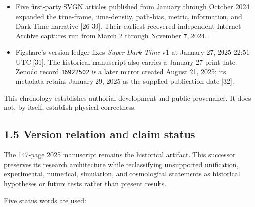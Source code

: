 \documentclass[
  american,
  11pt,
  letterpaper,
]{article}
\begin{document}
\begin{itemize}
  On December 15, 2023, \texttt{QGTCD.md} consolidated the QGTCD program and proposed exploratory mathematical modifications involving a local time-frame variable {[}25{]}. Those equations document development; this successor does not inherit them as validated mathematics.
\item
  Five first-party SVGN articles published from January through October 2024 expanded the time-frame, time-density, path-bias, metric, information, and Dark Time narrative {[}26-30{]}. Their earliest recovered independent Internet Archive captures run from March 2 through November 7, 2024.
\item
  Figshare's version ledger fixes \emph{Super Dark Time} v1 at January 27, 2025 22:51 UTC {[}31{]}. The historical manuscript also carries a January 27 print date. Zenodo record \texttt{16922502} is a later mirror created August 21, 2025; its metadata retains January 29, 2025 as the supplied publication date {[}32{]}.
\end{itemize}

This chronology establishes authorial development and public provenance. It does not, by itself, establish physical correctness.

\subsection{1.5 Version relation and claim status}\label{version-relation-and-claim-status}

The 147-page 2025 manuscript remains the historical artifact. This successor preserves its research architecture while reclassifying unsupported unification, experimental, numerical, simulation, and cosmological statements as historical hypotheses or future tests rather than present results.

Five status words are used:
\end{document}
